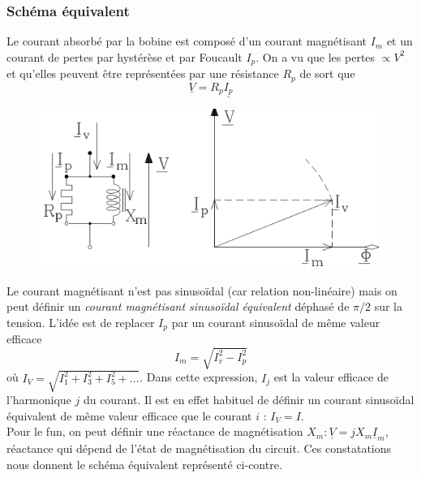 		\subsubsection{Schéma équivalent}
		Le courant absorbé par la bobine est composé d'un courant 
		magnétisant $I_m$ et un courant de pertes par hystérèse et par 
		Foucault $I_p$. On a vu que les pertes $\propto V^2$ et qu'elles 
		peuvent être représentées par une résistance $R_p$ de sort que 
		\begin{equation}
		\underline{V} = R_p\underline{I_p}
		\end{equation}
		\newpage
		\begin{figure}
		\includegraphics[scale=0.3]{ch3/image6.png}
		\end{figure}
		Le courant magnétisant n'est pas sinusoïdal (car relation non-linéaire)
		mais on peut définir 
		un \textit{courant magnétisant sinusoïdal équivalent} déphasé de 
		$\pi/2$ sur la tension. L'idée est de replacer $I_p$ par un courant 
		sinusoïdal de même valeur efficace
		\begin{equation}
		I_m= \sqrt{I_v^2-I_p^2}
		\end{equation}
		où $I_V = \sqrt{I_1^2+I_3^2+I_5^2+\dots}$. Dans cette expression, 
		$I_j$ est la valeur efficace de l'harmonique $j$ du courant. Il est 
		en effet habituel de définir un courant sinusoïdal équivalent de  
		même valeur efficace que le courant $i$ : $I_V = I$.\\
		Pour le fun, on peut définir une réactance de magnétisation $X_m : 
		\underline{V} = jX_m\underline{I}_m$, réactance qui dépend de l'état 
		de magnétisation du circuit. Ces constatations nous donnent le 
		schéma équivalent représenté ci-contre.
		
